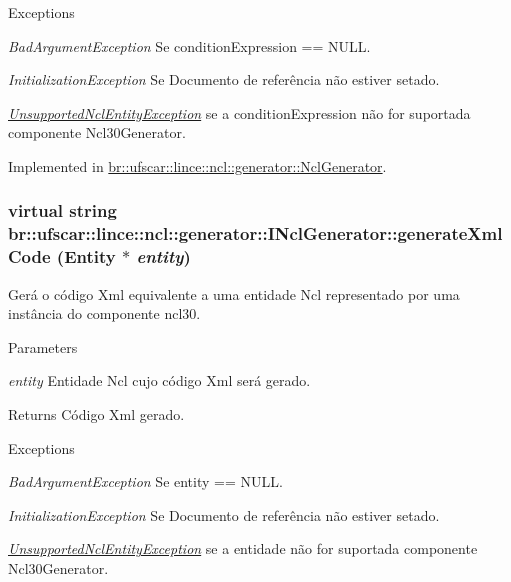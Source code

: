 \begin{DoxyExceptions}{Exceptions}
\item[{\em BadArgumentException}]Se conditionExpression == NULL. \item[{\em InitializationException}]Se Documento de referência não estiver setado. \item[{\em \hyperlink{classbr_1_1ufscar_1_1lince_1_1ncl_1_1generator_1_1UnsupportedNclEntityException}{UnsupportedNclEntityException}}]se a conditionExpression não for suportada componente Ncl30Generator. \end{DoxyExceptions}


Implemented in \hyperlink{classbr_1_1ufscar_1_1lince_1_1ncl_1_1generator_1_1NclGenerator_a1c0a01534324eb9c5614b72391844cd5}{br::ufscar::lince::ncl::generator::NclGenerator}.

\hypertarget{classbr_1_1ufscar_1_1lince_1_1ncl_1_1generator_1_1INclGenerator_ab15f1ff3a96439e2a33427c7df5d9988}{
\subsubsection[{generateXmlCode}]{\setlength{\rightskip}{0pt plus 5cm}virtual string br::ufscar::lince::ncl::generator::INclGenerator::generateXmlCode (Entity $\ast$ {\em entity})}}
\label{classbr_1_1ufscar_1_1lince_1_1ncl_1_1generator_1_1INclGenerator_ab15f1ff3a96439e2a33427c7df5d9988}


Gerá o código Xml equivalente a uma entidade Ncl representado por uma instância do componente ncl30. 


\begin{DoxyParams}{Parameters}
\item[{\em entity}]Entidade Ncl cujo código Xml será gerado. \end{DoxyParams}
\begin{DoxyReturn}{Returns}
Código Xml gerado. 
\end{DoxyReturn}

\begin{DoxyExceptions}{Exceptions}
\item[{\em BadArgumentException}]Se entity == NULL. \item[{\em InitializationException}]Se Documento de referência não estiver setado. \item[{\em \hyperlink{classbr_1_1ufscar_1_1lince_1_1ncl_1_1generator_1_1UnsupportedNclEntityException}{UnsupportedNclEntityException}}]se a entidade não for suportada componente Ncl30Generator. \end{DoxyExceptions}


